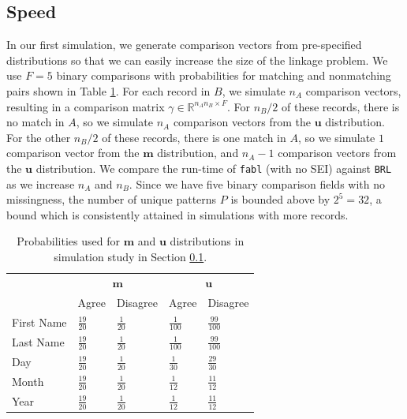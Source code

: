 \documentclass[ba]{imsart}
\begin{document}
	\hypertarget{speed}{%
		\subsection{Speed}\label{speed}}
	
	In our first simulation, we generate comparison vectors from pre-specified distributions so that we can easily increase the size of the linkage problem. We use $F = 5$ binary comparisons with probabilities for matching and nonmatching pairs shown in Table \ref{Tab:distributions}. For each record in $B$, we simulate $n_A$ comparison vectors, resulting in a comparison matrix $\gamma \in \mathbb{R}^{n_A n_B \times F}$. For $n_B/2$ of these records, there is no match in $A$, so we simulate $n_A$ comparison vectors from the $\bm{u}$ distribution. For the other $n_B/2$ of these records, there is one match in $A$, so we simulate $1$ comparison vector from the $\bm{m}$ distribution, and $n_A - 1$ comparison vectors from the $\bm{u}$ distribution. We compare the run-time of \texttt{fabl} (with no SEI) against \texttt{BRL} as we increase $n_A$ and $n_B$. Since we have five binary comparison fields with no missingness, the number of unique patterns $P$ is bounded above by $2^5 = 32$, a bound which is consistently attained in simulations with more records.
	

	
	\begin{table}[t]
		\centering
		\begin{tabular}{lll|ll}
			\multicolumn{1}{c}{ } & \multicolumn{2}{c}{$\bm{m}$} & \multicolumn{2}{c}{$\bm{u}$} \\
			\cline{2-3} \cline{4-5}
			& Agree & Disagree & Agree & Disagree \\
			\hline
			First Name & $\frac{19}{20}$ & $\frac{1}{20}$ & $\frac{1}{100}$ &  $\frac{99}{100}$ \\ 
			Last Name & $\frac{19}{20}$ & $\frac{1}{20}$ & $\frac{1}{100}$ &  $\frac{99}{100}$ \\ 
			Day & $\frac{19}{20}$ & $\frac{1}{20}$ & $\frac{1}{30}$ &  $\frac{29}{30}$ \\ 
			Month & $\frac{19}{20}$ & $\frac{1}{20}$ & $\frac{1}{12}$ &  $\frac{11}{12}$ \\ 
			Year & $\frac{19}{20}$ & $\frac{1}{20}$ & $\frac{1}{12}$ &  $\frac{11}{12}$ \\  
			\hline
		\end{tabular}
		\caption{Probabilities used for $\bm{m}$ and $\bm{u}$ distributions in simulation study in Section \ref{speed}.}\label{Tab:distributions}
	\end{table}
	
\end{document}
